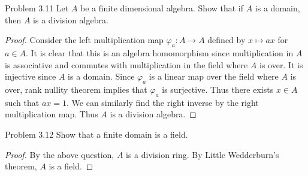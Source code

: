 \documentclass[a4paper]{article}
\begin{document}
\begin{ex}{Problem 3.11}{} Let $A$ be a finite dimensional algebra. Show that if $A$ is a domain, then $A$ is a division algebra. \tcbline
\begin{proof}
Consider the left multiplication map $\varphi_a:A\to A$ defined by $x\mapsto ax$ for $a\in A$. It is clear that this is an algebra homomorphism since multiplication in $A$ is associative and commutes with multiplication in the field where $A$ is over. It is injective since $A$ is a domain. Since $\varphi_a$ is a linear map over the field where $A$ is over, rank nullity theorem implies that $\varphi_a$ is surjective. Thus there exists $x\in A$ such that $ax=1$. We can similarly find the right inverse by the right multiplication map. Thus $A$ is a division algebra. 
\end{proof}
\end{ex}

\begin{ex}{Problem 3.12}{} Show that a finite domain is a field. \tcbline
\begin{proof}
By the above question, $A$ is a division ring. By Little Wedderburn's theorem, $A$ is a field. 
\end{proof}
\end{ex}
\end{document}
